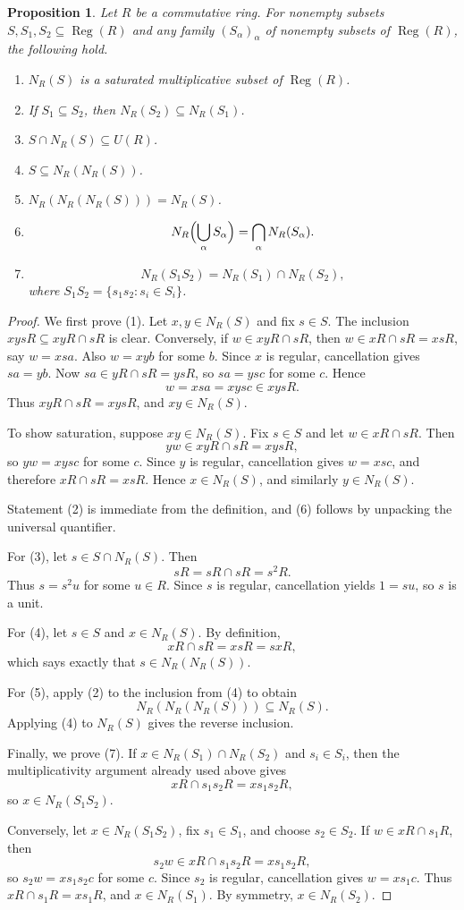 \documentclass[11pt]{amsart}
\newtheorem{proposition}[theorem]{Proposition}
\theoremstyle{definition}
\theoremstyle{remark}
\newcommand{\Reg}{\operatorname{Reg}}
\begin{document}
\begin{proposition}\label{prop:mcomp}
Let $R$ be a commutative ring.
For nonempty subsets $S,S_1,S_2 \subseteq \Reg(R)$ and any family $(S_\alpha)_\alpha$ of nonempty subsets of $\Reg(R)$, the following hold.
\begin{enumerate}
\item $N_R(S)$ is a saturated multiplicative subset of $\Reg(R)$.
\item If $S_1 \subseteq S_2$, then $N_R(S_2)\subseteq N_R(S_1)$.
\item $S \cap N_R(S)\subseteq U(R)$.
\item $S \subseteq N_R(N_R(S))$.
\item $N_R(N_R(N_R(S)))=N_R(S)$.
\item
\[
N_R\Bigl(\bigcup_\alpha S_\alpha\Bigr)=\bigcap_\alpha N_R(S_\alpha).
\]
\item
\[
N_R(S_1S_2)=N_R(S_1)\cap N_R(S_2),
\]
where $S_1S_2=\{s_1s_2 : s_i \in S_i\}$.
\end{enumerate}
\end{proposition}

\begin{proof}
We first prove (1).
Let $x,y \in N_R(S)$ and fix $s \in S$.
The inclusion $xysR \subseteq xyR \cap sR$ is clear.
Conversely, if $w \in xyR \cap sR$, then $w \in xR \cap sR=xsR$, say $w=xsa$.
Also $w=xyb$ for some $b$.
Since $x$ is regular, cancellation gives $sa=yb$.
Now $sa \in yR \cap sR=ysR$, so $sa=ysc$ for some $c$.
Hence
\[
w=xsa=xysc \in xysR.
\]
Thus $xyR \cap sR=xysR$, and $xy \in N_R(S)$.

To show saturation, suppose $xy \in N_R(S)$.
Fix $s \in S$ and let $w \in xR \cap sR$.
Then
\[
yw \in xyR \cap sR=xysR,
\]
so $yw=xysc$ for some $c$.
Since $y$ is regular, cancellation gives $w=xsc$, and therefore $xR \cap sR=xsR$.
Hence $x \in N_R(S)$, and similarly $y \in N_R(S)$.

Statement (2) is immediate from the definition, and (6) follows by unpacking the universal quantifier.

For (3), let $s \in S \cap N_R(S)$.
Then
\[
sR=sR \cap sR=s^2R.
\]
Thus $s=s^2u$ for some $u \in R$.
Since $s$ is regular, cancellation yields $1=su$, so $s$ is a unit.

For (4), let $s \in S$ and $x \in N_R(S)$.
By definition,
\[
xR \cap sR=xsR=sxR,
\]
which says exactly that $s \in N_R(N_R(S))$.

For (5), apply (2) to the inclusion from (4) to obtain
\[
N_R(N_R(N_R(S)))\subseteq N_R(S).
\]
Applying (4) to $N_R(S)$ gives the reverse inclusion.

Finally, we prove (7).
If $x \in N_R(S_1)\cap N_R(S_2)$ and $s_i \in S_i$, then the multiplicativity argument already used above gives
\[
xR \cap s_1s_2R=xs_1s_2R,
\]
so $x \in N_R(S_1S_2)$.

Conversely, let $x \in N_R(S_1S_2)$, fix $s_1 \in S_1$, and choose $s_2 \in S_2$.
If $w \in xR \cap s_1R$, then
\[
s_2w \in xR \cap s_1s_2R=xs_1s_2R,
\]
so $s_2w=xs_1s_2c$ for some $c$.
Since $s_2$ is regular, cancellation gives $w=xs_1c$.
Thus $xR \cap s_1R=xs_1R$, and $x \in N_R(S_1)$.
By symmetry, $x \in N_R(S_2)$.
\end{proof}
\end{document}
